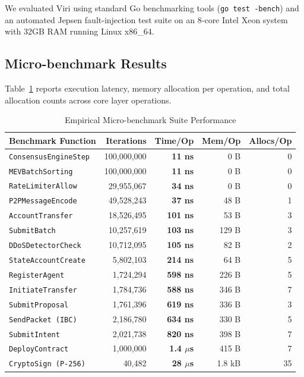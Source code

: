 \documentclass[10pt,journal,compsoc,twocolumn]{IEEEtran}
\begin{document}
We evaluated Viri using standard Go benchmarking tools (\texttt{go test -bench}) and an automated Jepsen fault-injection test suite on an 8-core Intel Xeon system with 32GB RAM running Linux x86\_64.

\subsection{Micro-benchmark Results}
Table~\ref{tab:microbenchmarks} reports execution latency, memory allocation per operation, and total allocation counts across core layer operations.

\begin{table}[h]
\caption{Empirical Micro-benchmark Suite Performance}
\label{tab:microbenchmarks}
\centering
\begin{tabular}{lrrrr}
\toprule
\textbf{Benchmark Function} & \textbf{Iterations} & \textbf{Time/Op} & \textbf{Mem/Op} & \textbf{Allocs/Op} \\
\midrule
\texttt{ConsensusEngineStep} & 100,000,000 & \textbf{11 ns} & 0 B & 0 \\
\texttt{MEVBatchSorting} & 100,000,000 & \textbf{11 ns} & 0 B & 0 \\
\texttt{RateLimiterAllow} & 29,955,067 & \textbf{34 ns} & 0 B & 0 \\
\texttt{P2PMessageEncode} & 49,528,243 & \textbf{37 ns} & 48 B & 1 \\
\texttt{AccountTransfer} & 18,526,495 & \textbf{101 ns} & 53 B & 3 \\
\texttt{SubmitBatch} & 10,257,619 & \textbf{103 ns} & 129 B & 3 \\
\texttt{DDoSDetectorCheck} & 10,712,095 & \textbf{105 ns} & 82 B & 2 \\
\texttt{StateAccountCreate} & 5,802,103 & \textbf{214 ns} & 64 B & 5 \\
\texttt{RegisterAgent} & 1,724,294 & \textbf{598 ns} & 226 B & 5 \\
\texttt{InitiateTransfer} & 1,784,736 & \textbf{588 ns} & 346 B & 7 \\
\texttt{SubmitProposal} & 1,761,396 & \textbf{619 ns} & 336 B & 3 \\
\texttt{SendPacket (IBC)} & 2,186,780 & \textbf{634 ns} & 330 B & 5 \\
\texttt{SubmitIntent} & 2,021,738 & \textbf{820 ns} & 398 B & 7 \\
\texttt{DeployContract} & 1,000,000 & \textbf{1.4 $\mu$s} & 415 B & 7 \\
\texttt{CryptoSign (P-256)} & 40,482 & \textbf{28 $\mu$s} & 1.8 kB & 35 \\

\end{tabular}
\end{table}
\end{document}
